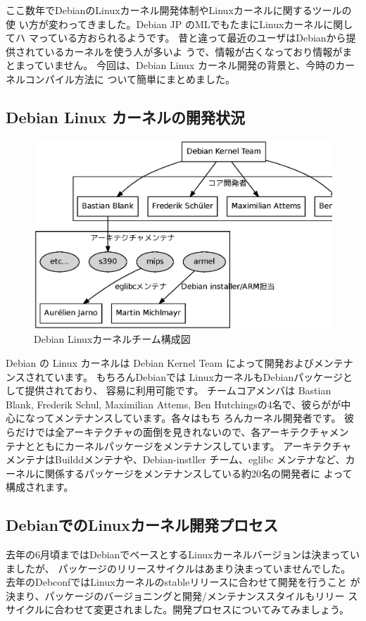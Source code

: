 \documentclass[mingoth,a4paper]{jsarticle}
\begin{document}
ここ数年でDebianのLinuxカーネル開発体制やLinuxカーネルに関するツールの使
い方が変わってきました。Debian JP のMLでもたまにLinuxカーネルに関してハ
マっている方おられるようです。
昔と違って最近のユーザはDebianから提供されているカーネルを使う人が多いよ
うで、情報が古くなっており情報がまとまっていません。
今回は、Debian Linux カーネル開発の背景と、今時のカーネルコンパイル方法に
ついて簡単にまとめました。

\subsection{Debian Linux カーネルの開発状況}

\begin{figure}[H]
\begin{center}
\includegraphics[width=0.8\hsize]{image201005/debian-kernel-team.eps}
\caption{Debian Linuxカーネルチーム構成図}
\label{fig:debian-kernel-team}
\end{center}
\end{figure}

Debian の Linux カーネルは Debian Kernel Team によって開発およびメンテナ
ンスされています。
もちろんDebianでは LinuxカーネルもDebianパッケージとして提供されており、
容易に利用可能です。
チームコアメンバは Bastian Blank, Frederik Schul, Maximilian Attems,
Ben Hutchingsの4名で、彼らがが中心になってメンテナンスしています。各々はもち
ろんカーネル開発者です。
彼らだけでは全アーキテクチャの面倒を見きれないので、各アーキテクチャメン
テナとともにカーネルパッケージをメンテナンスしています。
アーキテクチャメンテナはBuilddメンテナや、Debian-instller チーム、eglibc
メンテナなど、カーネルに関係するパッケージをメンテナンスしている約20名の開発者に
よって構成されます。

\subsection{DebianでのLinuxカーネル開発プロセス}
去年の6月頃まではDebianでベースとするLinuxカーネルバージョンは決まっていましたが、
パッケージのリリースサイクルはあまり決まっていませんでした。
去年のDebconfではLinuxカーネルのstableリリースに合わせて開発を行うこと
が決まり、パッケージのバージョニングと開発/メンテナンススタイルもリリー
スサイクルに合わせて変更されました。開発プロセスについてみてみましょう。
\end{document}
